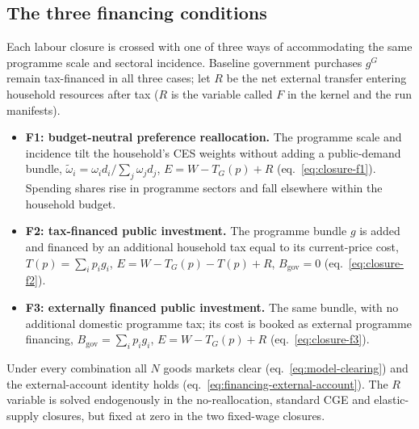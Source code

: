 \subsection{The three financing conditions}\label{app:foc-financing}

Each labour closure is crossed with one of three ways of accommodating the
same programme scale and sectoral incidence. Baseline government purchases
$g^G$ remain tax-financed in all three cases; let $R$ be the net external
transfer entering household resources after tax ($R$ is the variable called
$F$ in the kernel and the run manifests).

\begin{itemize}
\item \textbf{F1: budget-neutral preference reallocation.} The programme
  scale and incidence tilt the household's CES weights without adding a
  public-demand bundle, $\widetilde\omega_i=\omega_i d_i/\sum_j\omega_j d_j$,
  $E=W-T_G(p)+R$ (eq.~\ref{eq:closure-f1}). Spending shares rise in
  programme sectors and fall elsewhere within the household budget.
\item \textbf{F2: tax-financed public investment.} The programme bundle $g$
  is added and financed by an additional household tax equal to its
  current-price cost, $T(p)=\sum_i p_i g_i$, $E=W-T_G(p)-T(p)+R$,
  $B_{\mathrm{gov}}=0$ (eq.~\ref{eq:closure-f2}).
\item \textbf{F3: externally financed public investment.} The same bundle,
  with no additional domestic programme tax; its cost is booked as external
  programme financing, $B_{\mathrm{gov}}=\sum_i p_i g_i$,
  $E=W-T_G(p)+R$ (eq.~\ref{eq:closure-f3}).
\end{itemize}

Under every combination all $N$ goods markets clear
(eq.~\ref{eq:model-clearing}) and the external-account identity holds
(eq.~\ref{eq:financing-external-account}). The $R$ variable is solved
endogenously in the no-reallocation, standard CGE and elastic-supply
closures, but fixed at zero in the two fixed-wage closures.
